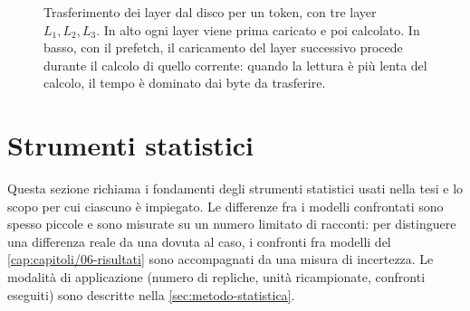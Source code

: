\begin{figure}[htbp]
\centering
{}
\caption{Trasferimento dei layer dal disco per un token, con tre layer $L_1,L_2,L_3$. In alto ogni layer viene prima caricato e poi calcolato. In basso, con il prefetch, il caricamento del layer successivo procede durante il calcolo di quello corrente: quando la lettura è più lenta del calcolo, il tempo è dominato dai byte da trasferire.}
\label{fig:prefetch}
\end{figure}
\newpage
\section{Strumenti statistici}

Questa sezione richiama i fondamenti degli strumenti statistici usati nella tesi e lo scopo per cui ciascuno è impiegato. Le differenze fra i modelli confrontati sono spesso piccole e sono misurate su un numero limitato di racconti: per distinguere una differenza reale da una dovuta al caso, i confronti fra modelli del \autoref{cap:capitoli/06-risultati} sono accompagnati da una misura di incertezza. Le modalità di applicazione (numero di repliche, unità ricampionate, confronti eseguiti) sono descritte nella \autoref{sec:metodo-statistica}.

